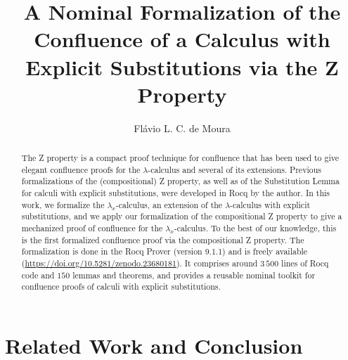 \documentclass[runningheads]{llncs}
\begin{document}
  
\title{A Nominal Formalization of the Confluence of a Calculus with Explicit Substitutions via the Z Property}
\author{Flávio L. C. de Moura}



\maketitle

\begin{abstract}
  The Z property is a compact proof technique for confluence that has been used to give elegant confluence proofs for the $\lambda$-calculus and several of its extensions. Previous formalizations of the (compositional) Z property, as well as of the Substitution Lemma for calculi with explicit substitutions, were developed in Rocq by the author. In this work, we formalize the $\lambda_x$-calculus, an extension of the $\lambda$-calculus with explicit substitutions, and we apply our formalization of the compositional Z property to give a mechanized proof of confluence for the $\lambda_x$-calculus. To the best of our knowledge, this is the first formalized confluence proof via the compositional Z property. The formalization is done in the Rocq Prover (version 9.1.1) and is freely available (\url{https://doi.org/10.5281/zenodo.23680181}). It comprises around $3\,500$ lines of Rocq code and $150$ lemmas and theorems, and provides a reusable nominal toolkit for confluence proofs of calculi with explicit substitutions.
\end{abstract}







\section{Related Work and Conclusion}
\end{document}

